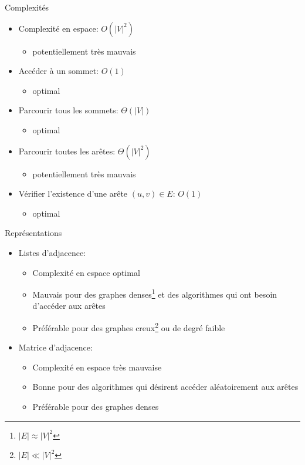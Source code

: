 \begin{frame}{Complexités}
\begin{itemize}
\item Complexité en espace: $O(|V|^2)$
\begin{itemize}
\item potentiellement très mauvais
\end{itemize}
\item Accéder à un sommet: $O(1)$
\begin{itemize}
\item optimal
\end{itemize}
\item Parcourir tous les sommets: $\Theta(|V|)$
\begin{itemize}
\item optimal
\end{itemize}
\item Parcourir toutes les arêtes: $\Theta(|V|^2)$
\begin{itemize}
\item potentiellement très mauvais
\end{itemize}
\item Vérifier l'existence d'une arête $(u,v)\in E$: $O(1)$
\begin{itemize}
\item optimal
\end{itemize}
\end{itemize}
\end{frame}

\begin{frame}{Représentations}
\begin{itemize}
\item Listes d'adjacence:
\begin{itemize}
\item Complexité en espace optimal
\item Mauvais pour des graphes \alert{denses\footnote{$|E|\approx |V|^2$}} et des algorithmes qui ont besoin d'accéder aux arêtes
\item Préférable pour des graphes \alert{creux\footnote{$|E|\ll |V|^2$}} ou de degré faible
\end{itemize}

\bigskip

\item Matrice d'adjacence:
\begin{itemize}
\item Complexité en espace très mauvaise
\item Bonne pour des algorithmes qui désirent accéder aléatoirement aux arêtes
\item Préférable pour des graphes \alert{denses}
\end{itemize}
\end{itemize}

\end{frame}

